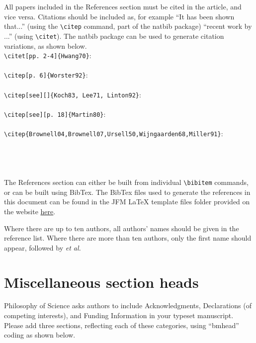 \documentclass[lineno]{JFM-FLM_Au}
\begin{document}
All papers included in the References section must be cited in the article, and vice versa. Citations should be included as, for example ``It has been shown \citep{Rogallo81} that...'' (using the {\verb}\citep}} command, part of the natbib package) ``recent work by \citet{Dennis85}...'' (using {\verb}\citet}}).
The natbib package can be used to generate citation variations, as shown below.\\
\verb#\citet[pp. 2-4]{Hwang70}#:\\
\citet[pp. 2-4]{Hwang70} \\
\verb#\citep[p. 6]{Worster92}#:\\
\citep[p. 6]{Worster92}\\
\verb#\citep[see][]{Koch83, Lee71, Linton92}#:\\
\citep[see][]{Koch83, Lee71, Linton92}\\
\verb#\citep[see][p. 18]{Martin80}#:\\
\citep[see][p. 18]{Martin80}\\
\verb#\citep{Brownell04,Brownell07,Ursell50,Wijngaarden68,Miller91}#:\\
\citep{Brownell04,Brownell07,Ursell50,Wijngaarden68,Miller91}\\
\citep{Briukhanovetal1967}\\
\cite{Bouguet01}\\
\citep{JosephSaut1990}\\

The References section can either be built from individual \verb#\bibitem# commands, or can be built using BibTex. The BibTex files used to generate the references in this document can be found in the JFM {\LaTeX} template files folder provided on the website \href{https://www.cambridge.org/core/journals/journal-of-fluid-mechanics/information/author-instructions/preparing-your-materials}{here}.

Where there are up to ten authors, all authors' names should be given in the reference list. Where there are more than ten authors, only the first name should appear, followed by {\it {et al.}}


\section{Miscellaneous section heads}

Philosophy of Science asks authors to include Acknowledgments, Declarations (of competing interests), and Funding Information in your typeset manuscript.  Please add three sections, reflecting each of these categories, using ``bmhead'' coding as shown below.
\end{document}
